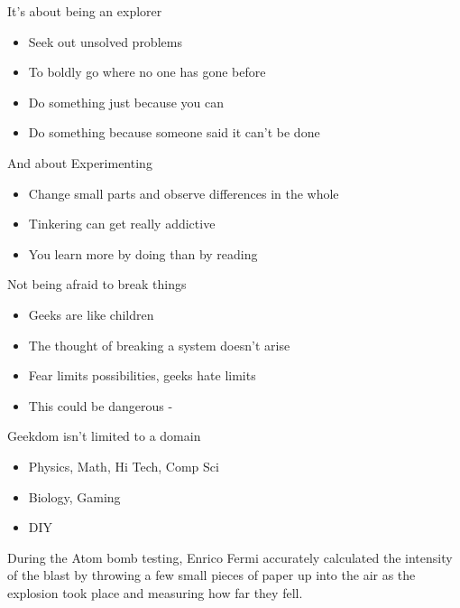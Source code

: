 \documentclass{beamer}
\begin{document}
\begin{frame}{It's about being an explorer}
  \begin{itemize}
  \item Seek out unsolved problems
  \item To boldly go where no one has gone before
  \item Do something just because you can
  \item Do something because someone said it can't be done
  \end{itemize}
\end{frame}

\begin{frame}{And about Experimenting}
  \begin{itemize}
  \item Change small parts and observe differences in the whole
  \item Tinkering can get really addictive
  \item You learn more by doing than by reading
  \end{itemize}
\end{frame}

\begin{frame}{Not being afraid to break things}
  \begin{itemize}
  \item Geeks are like children
  \item The thought of breaking a system doesn't arise
  \item Fear limits possibilities, geeks hate limits
  \item This could be dangerous - \href{http://www.unix-girl.com/blog/archives/001599.html}{}
  \end{itemize}
\end{frame}

\begin{frame}{Geekdom isn't limited to a domain}
  \begin{itemize}
  \item Physics, Math, Hi Tech, Comp Sci
  \item Biology, Gaming
  \item DIY
  \end{itemize}
\end{frame}

\begin{frame}
  \begin{block}{}
  \begin{center}
During the Atom bomb testing, Enrico Fermi accurately calculated the intensity
of the blast by throwing a few small pieces of paper up into the air as the
explosion took place and measuring how far they fell.
  \end{center}
  \end{block}
\end{frame}
\end{document}
